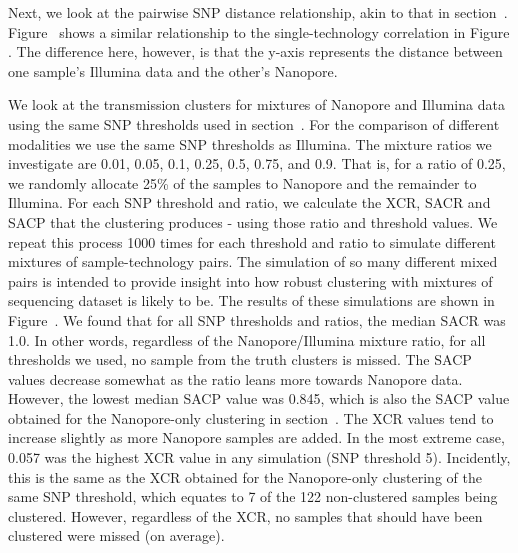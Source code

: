 Next, we look at the pairwise SNP distance relationship, akin to that in
section~.
Figure~ shows a similar relationship to
the single-technology correlation in Figure
. The difference here, however, is that
the y-axis represents the distance between one sample's Illumina data
and the other's Nanopore.~

We look at the transmission clusters for mixtures of Nanopore and
Illumina data using the same SNP thresholds used in
section~. For the comparison of different
modalities we use the same SNP thresholds as Illumina. The mixture
ratios we investigate are 0.01, 0.05, 0.1, 0.25, 0.5, 0.75, and 0.9.
That is, for a ratio of 0.25, we randomly allocate 25\% of the samples
to Nanopore and the remainder to Illumina. For each SNP threshold and
ratio, we calculate the XCR, SACR and SACP that the clustering produces
- using those ratio and threshold values. We repeat this process 1000
times for each threshold and ratio to simulate different mixtures of
sample-technology pairs. The simulation of so many different mixed pairs
is intended to provide insight into how robust clustering with mixtures
of sequencing dataset is likely to be. The results of these simulations
are shown in Figure~. We found that for
all SNP thresholds and ratios, the median SACR was 1.0. In other words,
regardless of the Nanopore/Illumina mixture ratio, for all thresholds we
used, no sample from the truth clusters is missed. The SACP values
decrease somewhat as the ratio leans more towards Nanopore data.
However, the lowest median SACP value was 0.845, which is also the SACP
value obtained for the Nanopore-only clustering in
section~. The XCR values tend to increase
slightly as more Nanopore samples are added. In the most extreme case,
0.057 was the highest XCR value in any simulation (SNP threshold 5).
Incidently, this is the same as the XCR obtained for the Nanopore-only
clustering of the same SNP threshold, which equates to 7 of the 122
non-clustered samples being clustered. However, regardless of the XCR,
no samples that should have been clustered were missed (on average).


